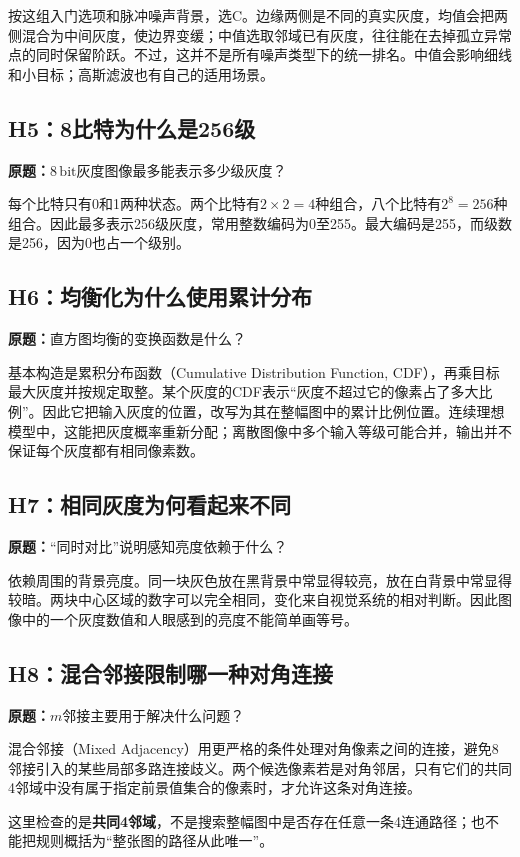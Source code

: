 按这组入门选项和脉冲噪声背景，选C。边缘两侧是不同的真实灰度，均值会把两侧混合为中间灰度，使边界变缓；中值选取邻域已有灰度，往往能在去掉孤立异常点的同时保留阶跃。不过，这并不是所有噪声类型下的统一排名。中值会影响细线和小目标；高斯滤波也有自己的适用场景。

\subsection{H5：8比特为什么是256级}
\label{original:H5}
\textbf{原题：}$8\,\mathrm{bit}$灰度图像最多能表示多少级灰度？

每个比特只有0和1两种状态。两个比特有$2\times2=4$种组合，八个比特有$2^8=256$种组合。因此最多表示256级灰度，常用整数编码为0至255。最大编码是255，而级数是256，因为0也占一个级别。

\subsection{H6：均衡化为什么使用累计分布}
\label{original:H6}
\textbf{原题：}直方图均衡的变换函数是什么？

基本构造是累积分布函数（Cumulative Distribution Function, CDF），再乘目标最大灰度并按规定取整。某个灰度的CDF表示“灰度不超过它的像素占了多大比例”。因此它把输入灰度的位置，改写为其在整幅图中的累计比例位置。连续理想模型中，这能把灰度概率重新分配；离散图像中多个输入等级可能合并，输出并不保证每个灰度都有相同像素数。

\subsection{H7：相同灰度为何看起来不同}
\label{original:H7}
\textbf{原题：}“同时对比”说明感知亮度依赖于什么？

依赖周围的背景亮度。同一块灰色放在黑背景中常显得较亮，放在白背景中常显得较暗。两块中心区域的数字可以完全相同，变化来自视觉系统的相对判断。因此图像中的一个灰度数值和人眼感到的亮度不能简单画等号。

\subsection{H8：混合邻接限制哪一种对角连接}
\label{original:H8}
\textbf{原题：}$m$邻接主要用于解决什么问题？

混合邻接（Mixed Adjacency）用更严格的条件处理对角像素之间的连接，避免8邻接引入的某些局部多路连接歧义。两个候选像素若是对角邻居，只有它们的共同4邻域中没有属于指定前景值集合的像素时，才允许这条对角连接。

这里检查的是\textbf{共同4邻域}，不是搜索整幅图中是否存在任意一条4连通路径；也不能把规则概括为“整张图的路径从此唯一”。

